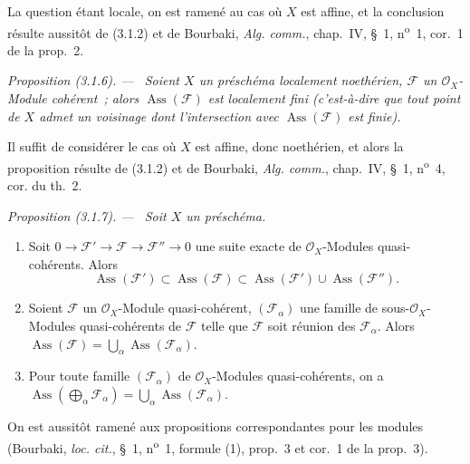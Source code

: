 \documentclass[10pt,oneside]{book}
\makeatletter
\newcommand{\oldpage}[2][]{%
  \setcounter{footnote}{0}%
  \marginpar{\scriptsize\textbf{#1}~|~#2}\ignorespaces}
\newenvironment{proposition}[1][]{%
  \par\medskip\noindent\itshape Proposition (#1). ---\ }{\par}
\newcommand{\EGAReaderTarget}[2]{\hypertarget{#1}{}\@bsphack\begingroup\def\@currentHref{#1}\label{#2}\endgroup\@esphack}
\makeatother
\begin{document}
La question étant locale, on est ramené au cas où $X$ est affine, et la
conclusion résulte aussitôt de (3.1.2) et de Bourbaki, \emph{Alg. comm.},
chap.~IV, \S~1, n\textsuperscript{o}~1, cor.~1 de la prop.~2.

\begin{proposition}[3.1.6]
\label{IV.2.3.1.6-fr}
Soient $X$ un préschéma localement noethérien, $\mathcal F$ un
$\mathcal O_X$-Module cohérent~; alors $\operatorname{Ass}(\mathcal F)$ est
\emph{localement fini} (c'est-à-dire que tout point de $X$ admet un voisinage
dont l'intersection avec $\operatorname{Ass}(\mathcal F)$ est finie).
\end{proposition}

Il suffit de considérer le cas où $X$ est affine, donc noethérien, et alors la
proposition résulte de (3.1.2) et de Bourbaki, \emph{Alg. comm.}, chap.~IV,
\S~1, n\textsuperscript{o}~4, cor. du th.~2.

\oldpage[IV-2]{38}
\begin{proposition}[3.1.7]
\EGAReaderTarget{ega4.c04.prop.3-1-7}{IV.2.3.1.7-fr}
Soit $X$ un préschéma.
\begin{enumerate}
\item[\emph{(i)}] Soit $0\to\mathcal F'\to\mathcal F\to\mathcal F''\to0$
une suite exacte de $\mathcal O_X$-Modules quasi-cohérents. Alors
\[
\operatorname{Ass}(\mathcal F')\subset\operatorname{Ass}(\mathcal F)
\subset\operatorname{Ass}(\mathcal F')\cup\operatorname{Ass}(\mathcal F'').
\]
\item[\emph{(ii)}] Soient $\mathcal F$ un $\mathcal O_X$-Module
quasi-cohérent, $(\mathcal F_\alpha)$ une famille de sous-$\mathcal O_X$-Modules
quasi-cohérents de $\mathcal F$ telle que $\mathcal F$ soit réunion des
$\mathcal F_\alpha$. Alors
$\operatorname{Ass}(\mathcal F)=\bigcup_\alpha\operatorname{Ass}(\mathcal F_\alpha)$.
\item[\emph{(iii)}] Pour toute famille $(\mathcal F_\alpha)$ de
$\mathcal O_X$-Modules quasi-cohérents, on a
$\operatorname{Ass}(\bigoplus_\alpha\mathcal F_\alpha)
=\bigcup_\alpha\operatorname{Ass}(\mathcal F_\alpha)$.
\end{enumerate}
\end{proposition}

On est aussitôt ramené aux propositions correspondantes pour les modules
(Bourbaki, \emph{loc. cit.}, \S~1, n\textsuperscript{o}~1, formule (1), prop.~3
et cor.~1 de la prop.~3).
\end{document}
